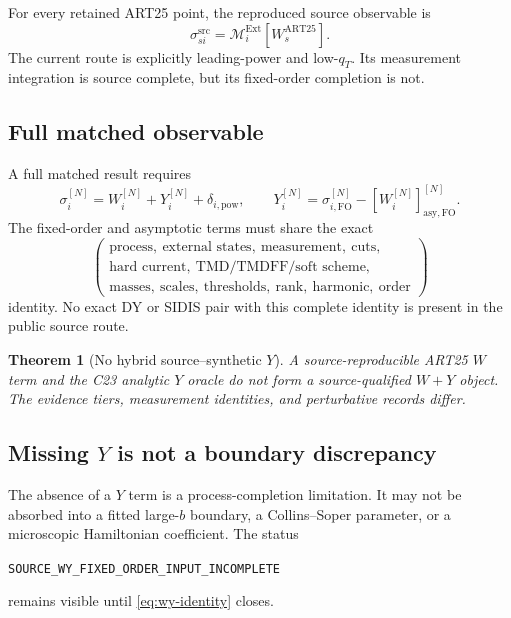 \documentclass[11pt]{article}
\newtheorem{theorem}[definition]{Theorem}
\newcommand{\FO}{\ensuremath{\mathrm{FO}}}
\newcommand{\cM}{\mathcal M}
\newcommand{\Ext}{\ensuremath{\mathrm{Ext}}}
\begin{document}
For every retained ART25 point, the reproduced source observable is
\begin{equation}
 \sigma_{si}^{\mathrm{src}}
 =
 \cM_i^{\Ext}
 \left[W_s^{\mathrm{ART25}}\right].
 \label{eq:source-w}
\end{equation}
The current route is explicitly leading-power and low-\(q_T\).  Its measurement integration is source complete, but its fixed-order completion is not.

\subsection{Full matched observable}

A full matched result requires
\begin{equation}
 \sigma_i^{[N]}
 =
 W_i^{[N]}
 +Y_i^{[N]}
 +\delta_{i,\mathrm{pow}},
 \qquad
 Y_i^{[N]}
 =
 \sigma_{i,\FO}^{[N]}
 -\left[W_i^{[N]}\right]_{\mathrm{asy,FO}}^{[N]}.
 \label{eq:wy-definition}
\end{equation}
The fixed-order and asymptotic terms must share the exact
\begin{equation}
 \left(
 \begin{gathered}
 \text{process},\ \text{external states},\ \text{measurement},\ \text{cuts},\\
 \text{hard current},\ \text{TMD/TMDFF/soft scheme},\\
 \text{masses},\ \text{scales},\ \text{thresholds},\ \text{rank},\ \text{harmonic},\ \text{order}
 \end{gathered}
 \right)
 \label{eq:wy-identity}
\end{equation}
identity.  No exact DY or SIDIS pair with this complete identity is present in the public source route.

\begin{theorem}[No hybrid source--synthetic \(Y\)]
A source-reproducible ART25 \(W\) term and the C23 analytic \(Y\) oracle do not form a source-qualified \(W+Y\) object.  The evidence tiers, measurement identities, and perturbative records differ.
\end{theorem}

\subsection{Missing \texorpdfstring{\(Y\)}{Y} is not a boundary discrepancy}

The absence of a \(Y\) term is a process-completion limitation.  It may not be absorbed into a fitted large-\(b\) boundary, a Collins--Soper parameter, or a microscopic Hamiltonian coefficient.  The status
\begin{center}
\texttt{SOURCE\_WY\_FIXED\_ORDER\_INPUT\_INCOMPLETE}
\end{center}
remains visible until \cref{eq:wy-identity} closes.
\end{document}
